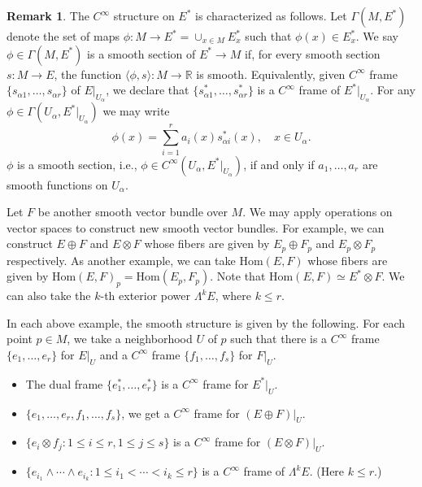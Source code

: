 \documentclass{amsart}
\numberwithin{equation}{section}
\newcommand{\bR}{\mathbb{R}}
\theoremstyle{definition}
\newtheorem{remark}[definition]{Remark}
\theoremstyle{theorem}
\begin{document}
\begin{remark}
The $C^\infty$ structure on $E^*$ is characterized as follows. 
Let $\Gamma(M,E^*)$ denote the set of maps $\phi: M\to E^*=\cup_{x\in M} E^*_x$ such that $\phi(x)\in E_x^*$.
We say $\phi\in \Gamma(M,E^*)$ is a smooth section of $E^*\to M$ if, for every smooth section 
$s: M\to E$, the function $\langle \phi,s\rangle: M\to \bR$ is smooth. Equivalently, given 
$C^\infty$ frame $\{ s_{\alpha 1},\ldots, s_{\alpha r}\}$ of $E|_{U_\alpha}$, we declare
that $\{ s_{\alpha 1}^*,\ldots, s_{\alpha r}^*\}$ is a $C^\infty$ frame of
$E^*|_{U_\alpha}$. For any $\phi\in \Gamma(U_\alpha, E^*|_{U_\alpha})$ we may write
$$
\phi(x) =\sum_{i=1}^r a_i(x) s_{\alpha i}^*(x),\quad x\in U_\alpha.
$$
$\phi$ is a smooth section, i.e., $\phi\in C^\infty(U_\alpha,E^*|_{U_\alpha})$, if and 
only if $a_1,\ldots, a_r$ are smooth functions on $U_\alpha$. 
\end{remark}





Let $F$ be another smooth vector bundle over $M$. We may apply operations on vector spaces to construct new smooth vector bundles. For example, we can construct $E \oplus F$ and $E \otimes F$ whose fibers are given by $E_p \oplus F_p$ and $E_p \otimes F_p$ respectively. As another example, we can take $\text{Hom}(E,F)$ whose fibers are given by $\text{Hom}(E,F)_p = \text{Hom}(E_p, F_p)$. Note that $\text{Hom}(E,F) \simeq E^* \otimes F$. 
We can also take the $k$-th exterior power $\Lambda^kE$, where $k\leq r$. 

In each above example, the smooth structure is given by the following. For each point $p \in M$, we take a neighborhood $U$ of $p$ such that there is a  $C^\infty$ frame $\{ e_1, \ldots, e_r\}$ for $E|_U$ and 
a $C^\infty$ frame $\{ f_1, \ldots, f_s\}$ for $F|_U$. 
\begin{itemize}
\item The dual frame $\{e_1^*, \ldots, e_r^*\}$  is a $C^\infty$ frame for $E^*|_U$. 
\item $\{ e_1, \ldots, e_r, f_1, \ldots, f_s\}$, we get a $C^\infty$ frame for $(E \oplus F)|_U$. 
\item $\{ e_i \otimes f_j: 1\leq i\leq r, 1\leq j\leq s\} $ is a $C^\infty$ frame for $(E \otimes F)|_U$. 
\item $\{ e_{i_1} \wedge \cdots \wedge e_{i_k} : 1 \le i_1 < \cdots < i_k \le r \} $ is
 a $C^\infty$ frame of $\Lambda^k E$. (Here $k\leq r$.) 
\end{itemize}
\end{document}
